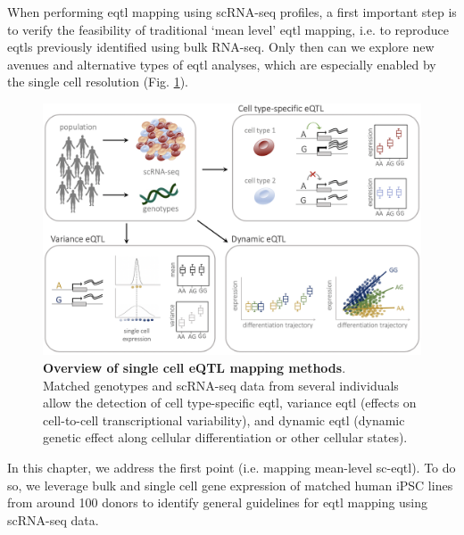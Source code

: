 When performing \gls{eqtl} mapping using scRNA-seq profiles, a first important step is to verify the feasibility of traditional `mean level' \gls{eqtl} mapping, i.e. to reproduce \glspl{eqtl} previously identified using bulk RNA-seq.
Only then can we explore new avenues and alternative types of \gls{eqtl} analyses, which are especially enabled by the single cell resolution (Fig. \ref{fig:sc_eqtl}).\\

\begin{figure}[h]
\centering
\includegraphics[width=14cm]{Chapter3/Fig/sc_eqtl.png}
\caption[Single cell eQTL]{\textbf{Overview of single cell eQTL mapping methods}.\\
Matched genotypes and scRNA-seq data from several individuals allow the detection of cell type-specific \gls{eqtl}, variance \gls{eqtl} (effects on cell-to-cell transcriptional variability), and dynamic \gls{eqtl} (dynamic genetic effect along cellular differentiation or other cellular states).}
\label{fig:sc_eqtl}
\end{figure}

In this chapter, we address the first point (i.e. mapping mean-level sc-\gls{eqtl}).
To do so, we leverage bulk and single cell gene expression of matched human 
iPSC
lines from around 100 donors to identify general guidelines for \gls{eqtl} mapping using scRNA-seq data.

